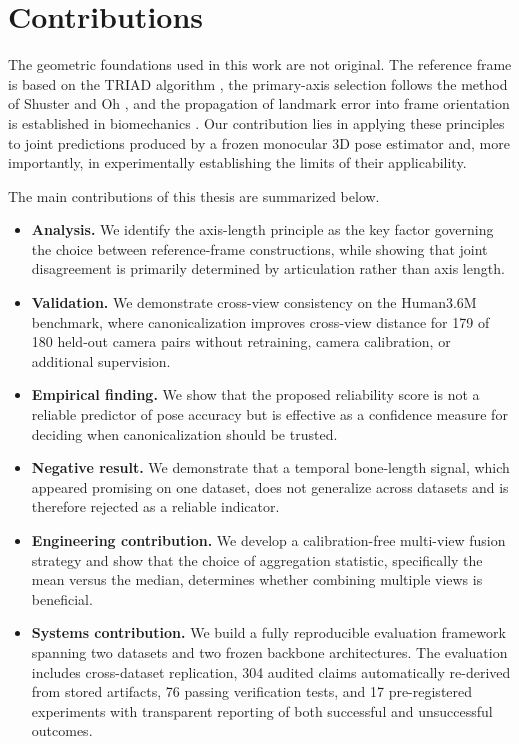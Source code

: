 \documentclass[12pt,a4paper]{report}
\begin{document}
\section{Contributions}

The geometric foundations used in this work are not original. The reference frame is based on the TRIAD algorithm \cite{triad}, the primary-axis selection follows the method of Shuster and Oh \cite{shuster}, and the propagation of landmark error into frame orientation is established in biomechanics \cite{dellacroce1999,dellacroce2005}. Our contribution lies in applying these principles to joint predictions produced by a frozen monocular 3D pose estimator and, more importantly, in experimentally establishing the limits of their applicability.

The main contributions of this thesis are summarized below.

\begin{itemize}
\item \textbf{Analysis.} We identify the axis-length principle as the key factor governing the choice between reference-frame constructions, while showing that joint disagreement is primarily determined by articulation rather than axis length.

\item \textbf{Validation.} We demonstrate cross-view consistency on the Human3.6M benchmark, where canonicalization improves cross-view distance for 179 of 180 held-out camera pairs without retraining, camera calibration, or additional supervision.

\item \textbf{Empirical finding.} We show that the proposed reliability score is not a reliable predictor of pose accuracy but is effective as a confidence measure for deciding when canonicalization should be trusted.

\item \textbf{Negative result.} We demonstrate that a temporal bone-length signal, which appeared promising on one dataset, does not generalize across datasets and is therefore rejected as a reliable indicator.

\item \textbf{Engineering contribution.} We develop a calibration-free multi-view fusion strategy and show that the choice of aggregation statistic, specifically the mean versus the median, determines whether combining multiple views is beneficial.

\item \textbf{Systems contribution.} We build a fully reproducible evaluation framework spanning two datasets and two frozen backbone architectures. The evaluation includes cross-dataset replication, 304 audited claims automatically re-derived from stored artifacts, 76 passing verification tests, and 17 pre-registered experiments with transparent reporting of both successful and unsuccessful outcomes.
\end{itemize}
\end{document}
